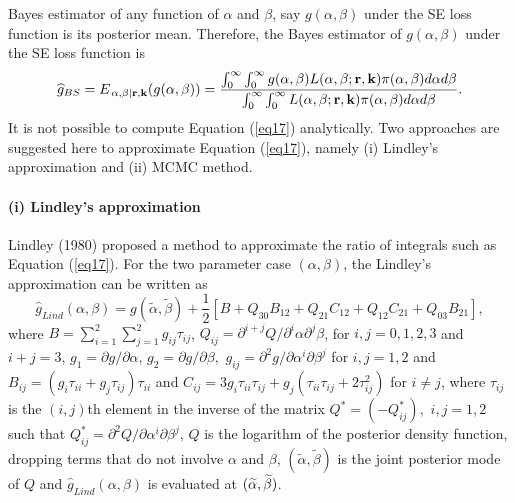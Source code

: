 \documentclass[a4paper, 11pt]{article}
\numberwithin{equation}{section}
\begin{document}
 Bayes estimator of any function of $\alpha $ and $\beta $, say $g(\alpha
,\beta )$ under the SE loss function is its posterior mean. Therefore, the
Bayes estimator of $g(\alpha ,\beta )$ under the SE loss function is%
\begin{equation}
\widehat{g}_{BS}=E_{\left. \alpha ,\beta \right\vert \mathbf{r,k}}(g(\alpha
,\beta ))=\frac{\int_{0}^{\infty }\int_{0}^{\infty }g(\alpha ,\beta
)L(\alpha ,\beta ;\mathbf{r,k})\pi (\alpha ,\beta )d\alpha d\beta }{%
\int_{0}^{\infty }\int_{0}^{\infty }L(\alpha ,\beta ;\mathbf{r,k})\pi
(\alpha ,\beta )d\alpha d\beta }.  \label{eq17}
\end{equation}%
It is not possible to compute Equation (\ref{eq17}) analytically. Two
approaches are suggested here to approximate Equation (\ref{eq17}), namely
(i) Lindley's approximation and (ii) MCMC method.

\paragraph{(i) Lindley's approximation}

Lindley (1980) proposed a method to approximate the ratio of integrals such
as Equation (\ref{eq17}). For the two parameter case $(\alpha ,\beta )$, the Lindley's approximation can be
written as 
\begin{equation}
\widehat{g}_{Lind}(\alpha ,\beta )=g(\widetilde{\alpha },\widetilde{\beta })+%
\frac{1}{2}\left[ B+Q_{30}B_{12}+Q_{21}C_{12}+Q_{12}C_{21}+Q_{03}B_{21}%
\right] ,  \label{eq18}
\end{equation}%
where $B=\sum_{i=1}^{2}\sum_{j=1}^{2}g_{ij}\tau _{ij}$, $Q_{ij}=\partial
^{i+j}Q/\partial ^{i}\alpha \partial ^{j}\beta $, for $i,j=0,1,2,3$ and $%
i+j=3$, $g_{1}=\partial g/\partial \alpha $, $g_{2}=\partial g/\partial
\beta ,$ $g_{ij}=\partial ^{2}g/\partial \alpha ^{i}\partial \beta ^{j}$ for 
$i,j=1,2$ and $B_{ij}=(g_{i}\tau _{ii}+g_{j}\tau _{ij})\tau _{ii}$ and $%
C_{ij}=3g_{i}\tau _{ii}\tau _{ij}+g_{j}(\tau _{ii}\tau _{ij}+2\tau
_{ij}^{2}) $ for $i\neq j$, where $\tau _{ij}$ is the $(i,j)$th element in
the inverse of the matrix $Q^{\ast }=(-Q_{ij}^{\ast }),$ $i,j=1,2$ such that 
$Q_{ij}^{\ast }=\partial ^{2}Q/\partial \alpha ^{i}\partial \beta ^{j}$, $Q$
is the logarithm of the posterior density function, dropping terms that do not involve $\alpha$ and $\beta$,
$(\widetilde{\alpha },%
\widetilde{\beta })$ is the joint posterior mode of $Q$ and $\widehat{g}%
_{Lind}(\alpha ,\beta )$ is evaluated at $(\widetilde{\alpha },\widetilde{%
\beta })$.
\end{document}
